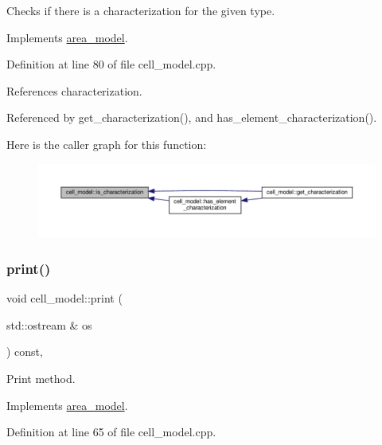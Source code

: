 Checks if there is a characterization for the given type. 



Implements \hyperlink{classarea__model_ae885ec3d0b487d31fd2e7537dd588ce3}{area\+\_\+model}.



Definition at line 80 of file cell\+\_\+model.\+cpp.



References characterization.



Referenced by get\+\_\+characterization(), and has\+\_\+element\+\_\+characterization().

Here is the caller graph for this function\+:
\nopagebreak
\begin{figure}[H]
\begin{center}
\leavevmode
\includegraphics[width=350pt]{d6/dcd/classcell__model_a96569fa865d6362be6e405ca34a46205_icgraph}
\end{center}
\end{figure}
\mbox{\label{classcell__model_a3b924669e2a19f7891151c235b83c060}} 
\subsubsection{\texorpdfstring{print()}{print()}}
{\footnotesize\ttfamily void cell\+\_\+model\+::print (\begin{DoxyParamCaption}\item[{std\+::ostream \&}]{os }\end{DoxyParamCaption}) const\hspace{0.3cm}{\ttfamily [override]}, {\ttfamily [virtual]}}



Print method. 



Implements \hyperlink{classarea__model_abdb74eba19254bd8c2098c006aef673c}{area\+\_\+model}.



Definition at line 65 of file cell\+\_\+model.\+cpp.



